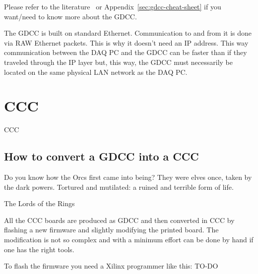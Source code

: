Please refer to the literature~\cite{GDCC:2012} or
Appendix~\ref{sec:gdcc-cheat-sheet} if you want/need to know more
about the GDCC.

The GDCC is built on standard Ethernet. Communication to and from it
is done via RAW Ethernet packets. This is why it doesn't need an IP
address. This way communication between the DAQ PC and the GDCC can be
faster than if they traveled through the IP layer but, this way, the
GDCC must necessarily be located on the same physical LAN network as
the DAQ PC.

\section{CCC}
CCC

\subsection{How to convert a GDCC into a CCC}
\epigraph{Do you know how the Orcs first came into being? They were elves once,
  taken by the dark powers. Tortured and mutilated: a ruined and terrible form
  of life.}{The Lords of the Rings} All the CCC boards are produced as GDCC and
then converted in CCC by flashing a new firmware and slightly modifying the
printed board. The modification is not so complex and with a minimum effort can
be done by hand if one has the right tools.

To flash the firmware you need a Xilinx programmer like this: TO-DO

